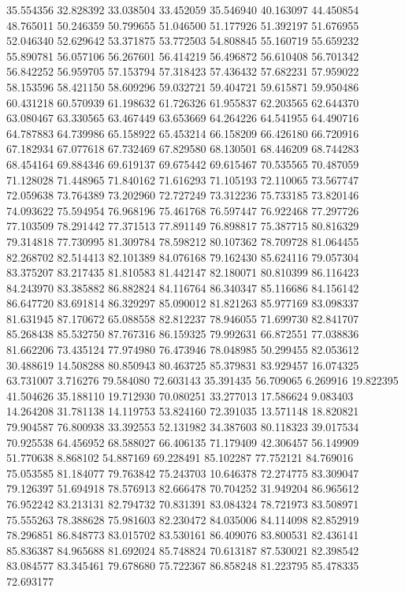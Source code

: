 35.554356
32.828392
33.038504
33.452059
35.546940
40.163097
44.450854
48.765011
50.246359
50.799655
51.046500
51.177926
51.392197
51.676955
52.046340
52.629642
53.371875
53.772503
54.808845
55.160719
55.659232
55.890781
56.057106
56.267601
56.414219
56.496872
56.610408
56.701342
56.842252
56.959705
57.153794
57.318423
57.436432
57.682231
57.959022
58.153596
58.421150
58.609296
59.032721
59.404721
59.615871
59.950486
60.431218
60.570939
61.198632
61.726326
61.955837
62.203565
62.644370
63.080467
63.330565
63.467449
63.653669
64.264226
64.541955
64.490716
64.787883
64.739986
65.158922
65.453214
66.158209
66.426180
66.720916
67.182934
67.077618
67.732469
67.829580
68.130501
68.446209
68.744283
68.454164
69.884346
69.619137
69.675442
69.615467
70.535565
70.487059
71.128028
71.448965
71.840162
71.616293
71.105193
72.110065
73.567747
72.059638
73.764389
73.202960
72.727249
73.312236
75.733185
73.820146
74.093622
75.594954
76.968196
75.461768
76.597447
76.922468
77.297726
77.103509
78.291442
77.371513
77.891149
76.898817
75.387715
80.816329
79.314818
77.730995
81.309784
78.598212
80.107362
78.709728
81.064455
82.268702
82.514413
82.101389
84.076168
79.162430
85.624116
79.057304
83.375207
83.217435
81.810583
81.442147
82.180071
80.810399
86.116423
84.243970
83.385882
86.882824
84.116764
86.340347
85.116686
84.156142
86.647720
83.691814
86.329297
85.090012
81.821263
85.977169
83.098337
81.631945
87.170672
65.088558
82.812237
78.946055
71.699730
82.841707
85.268438
85.532750
87.767316
86.159325
79.992631
66.872551
77.038836
81.662206
73.435124
77.974980
76.473946
78.048985
50.299455
82.053612
30.488619
14.508288
80.850943
80.463725
85.379831
83.929457
16.074325
63.731007
3.716276
79.584080
72.603143
35.391435
56.709065
6.269916
19.822395
41.504626
35.188110
19.712930
70.080251
33.277013
17.586624
9.083403
14.264208
31.781138
14.119753
53.824160
72.391035
13.571148
18.820821
79.904587
76.800938
33.392553
52.131982
34.387603
80.118323
39.017534
70.925538
64.456952
68.588027
66.406135
71.179409
42.306457
56.149909
51.770638
8.868102
54.887169
69.228491
85.102287
77.752121
84.769016
75.053585
81.184077
79.763842
75.243703
10.646378
72.274775
83.309047
79.126397
51.694918
78.576913
82.666478
70.704252
31.949204
86.965612
76.952242
83.213131
82.794732
70.831391
83.084324
78.721973
83.508971
75.555263
78.388628
75.981603
82.230472
84.035006
84.114098
82.852919
78.296851
86.848773
83.015702
83.530161
86.409076
83.800531
82.436141
85.836387
84.965688
81.692024
85.748824
70.613187
87.530021
82.398542
83.084577
83.345461
79.678680
75.722367
86.858248
81.223795
85.478335
72.693177
